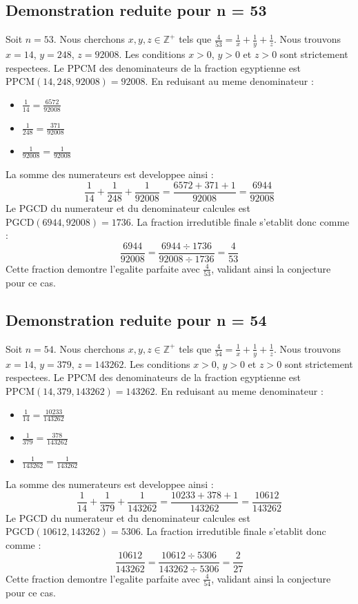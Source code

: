 \documentclass[11pt,a4paper]{article}
\begin{document}
\subsection{Demonstration reduite pour n = 53}
Soit $n = 53$. Nous cherchons $x, y, z \in \mathbb{Z}^{+}$ tels que $\frac{4}{53} = \frac{1}{x} + \frac{1}{y} + \frac{1}{z}$.
Nous trouvons $x = 14$, $y = 248$, $z = 92008$.
Les conditions $x > 0$, $y > 0$ et $z > 0$ sont strictement respectees.
Le PPCM des denominateurs de la fraction egyptienne est $\text{PPCM}(14, 248, 92008) = 92008$.
En reduisant au meme denominateur :
\begin{itemize}
    \item $\frac{1}{14} = \frac{6572}{92008}$
    \item $\frac{1}{248} = \frac{371}{92008}$
    \item $\frac{1}{92008} = \frac{1}{92008}$
\end{itemize}
La somme des numerateurs est developpee ainsi :
$$ \frac{1}{14} + \frac{1}{248} + \frac{1}{92008} = \frac{6572 + 371 + 1}{92008} = \frac{6944}{92008} $$
Le PGCD du numerateur et du denominateur calcules est $\text{PGCD}(6944, 92008) = 1736$.
La fraction irredutible finale s'etablit donc comme :
$$ \frac{6944}{92008} = \frac{6944 \div 1736}{92008 \div 1736} = \frac{4}{53} $$
Cette fraction demontre l'egalite parfaite avec $\frac{4}{53}$, validant ainsi la conjecture pour ce cas.

\subsection{Demonstration reduite pour n = 54}
Soit $n = 54$. Nous cherchons $x, y, z \in \mathbb{Z}^{+}$ tels que $\frac{4}{54} = \frac{1}{x} + \frac{1}{y} + \frac{1}{z}$.
Nous trouvons $x = 14$, $y = 379$, $z = 143262$.
Les conditions $x > 0$, $y > 0$ et $z > 0$ sont strictement respectees.
Le PPCM des denominateurs de la fraction egyptienne est $\text{PPCM}(14, 379, 143262) = 143262$.
En reduisant au meme denominateur :
\begin{itemize}
    \item $\frac{1}{14} = \frac{10233}{143262}$
    \item $\frac{1}{379} = \frac{378}{143262}$
    \item $\frac{1}{143262} = \frac{1}{143262}$
\end{itemize}
La somme des numerateurs est developpee ainsi :
$$ \frac{1}{14} + \frac{1}{379} + \frac{1}{143262} = \frac{10233 + 378 + 1}{143262} = \frac{10612}{143262} $$
Le PGCD du numerateur et du denominateur calcules est $\text{PGCD}(10612, 143262) = 5306$.
La fraction irredutible finale s'etablit donc comme :
$$ \frac{10612}{143262} = \frac{10612 \div 5306}{143262 \div 5306} = \frac{2}{27} $$
Cette fraction demontre l'egalite parfaite avec $\frac{4}{54}$, validant ainsi la conjecture pour ce cas.
\end{document}

